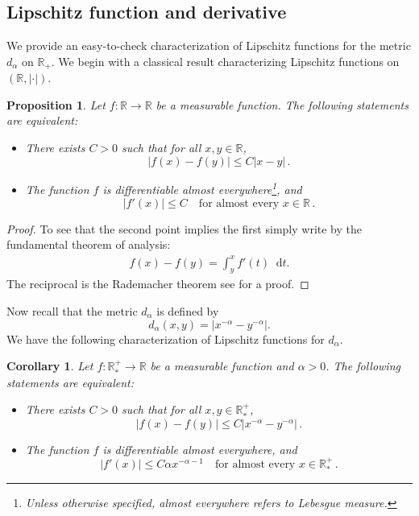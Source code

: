 \documentclass[11pt,a4paper]{article}
\newcommand{\RRP}{\mathbb{R}^+_*}
\newcommand{\dd}{\mathop{}\!\mathrm{d}}
\newtheorem{proposition}[theorem]{Proposition}
\newtheorem{corollary}[theorem]{Corollary}
\begin{document}
\subsection{Lipschitz function and derivative}
We provide an easy-to-check characterization of Lipschitz functions for the metric \( d_\alpha \) on \( \mathbb{R}_+ \). We begin with a classical result characterizing Lipschitz functions on \( (\mathbb{R}, |\cdot|) \).

\begin{proposition}\label{prop:characterisation-lip-1}
Let \( f : \mathbb{R} \to \mathbb{R} \) be a measurable function. The following statements are equivalent:
\begin{itemize}
    \item There exists \( C > 0 \) such that for all \( x, y \in \mathbb{R} \),
    \[
    |f(x) - f(y)| \leq C|x - y| \,.
    \]
    \item The function \( f \) is differentiable almost everywhere\footnote{Unless otherwise specified, \emph{almost everywhere} refers to Lebesgue measure.}, and
    \[
    |f'(x)| \leq C \quad \text{for almost every } x \in \mathbb{R} \,.
    \]
\end{itemize}
\end{proposition}
\begin{proof}
    To see that the second point implies the first simply write by the fundamental theorem of analysis:
    \begin{align*}
        f(x) - f(y) = \int_y^x f'(t) \dd t .
    \end{align*}
    The reciprocal is the Rademacher theorem see \cite{evans2018measure} for a proof.
\end{proof}
Now recall that the metric $d_\alpha$ is defined by 
\[
d_\alpha(x,y) = |x^{-\alpha} - y^{-\alpha}|.
\]
We have the following characterization of Lipschitz functions for $d_\alpha$.
\begin{corollary}
    Let \( f : \RRP \to \mathbb{R} \) be a measurable function and $\alpha > 0$. The following statements are equivalent:
\begin{itemize}
    \item There exists \( C > 0 \) such that for all \( x, y \in \RRP \),
    \[
    |f(x) - f(y)| \leq C|x^{-\alpha} - y^{-\alpha}| \,.
    \]
    \item The function \( f \) is differentiable almost everywhere, and
    \[
    |f'(x)| \leq C\alpha x^{-\alpha-1} \quad \text{for almost every } x \in \RRP \,.
    \]
\end{itemize}
\end{corollary}
\end{document}
